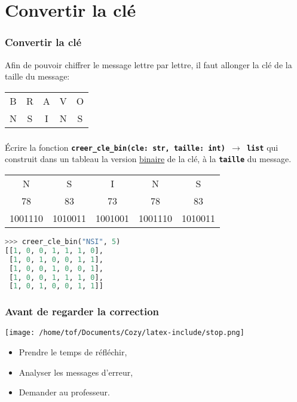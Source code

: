\documentclass[svgnames,11pt]{beamer}
\begin{document}
\section{Convertir la clé}
\begin{frame}
    \frametitle{Convertir la clé}

    Afin de pouvoir chiffrer le message lettre par lettre, il faut allonger la clé de la taille du message:
    \begin{center}
        \begin{tabular}{*{5}{c}}
            B&R&A&V&O\\
            N&S&I&N&S\\
        \end{tabular}
    \end{center}
\end{frame}
\begin{frame}[fragile]
    \frametitle{}

    \begin{activite}
    Écrire la fonction \textbf{\texttt{creer\_cle\_bin(cle: str, taille: int) $\rightarrow$ list}} qui construit dans un tableau la version \underline{binaire} de la clé, à la \textbf{\texttt{taille}} du message.
    \end{activite}
    \begin{center}
        \begin{tabular}{*{5}{c}}
            N&S&I&N&S\\
    
            78&83&73&78&83\\
            1001110&1010011&1001001&1001110&1010011\\
        \end{tabular}
\begin{lstlisting}[language=Python , basicstyle=\ttfamily\small, xleftmargin=0.2em, xrightmargin=0em]
>>> creer_cle_bin("NSI", 5)
[[1, 0, 0, 1, 1, 1, 0], 
 [1, 0, 1, 0, 0, 1, 1], 
 [1, 0, 0, 1, 0, 0, 1], 
 [1, 0, 0, 1, 1, 1, 0], 
 [1, 0, 1, 0, 0, 1, 1]]
\end{lstlisting}
\label{CODE}
\end{center}
\end{frame}
\begin{frame}
    \frametitle{Avant de regarder la correction}
\begin{center}
    \centering
    \texttt{[image: /home/tof/Documents/Cozy/latex-include/stop.png]}
    \end{center}
{\Large
    \begin{itemize}
        \item Prendre le temps de réfléchir,
        \item Analyser les messages d'erreur,
        \item Demander au professeur.
    \end{itemize}
}
\end{frame}
\end{document}
